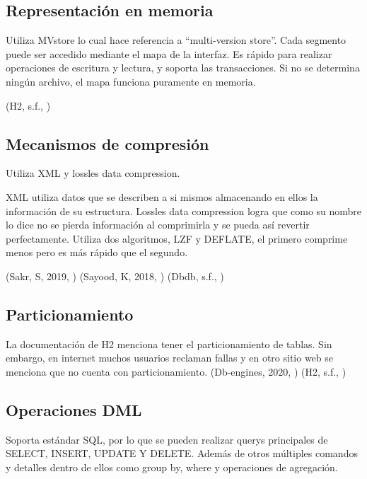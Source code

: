 \documentclass{acmart}
\begin{document}
\subsection{Representación en memoria}

Utiliza MVstore lo cual hace referencia a “multi-version store”. Cada segmento puede ser accedido mediante el mapa de la interfaz. Es rápido para realizar operaciones de escritura y lectura, y soporta las transacciones. Si no se determina ningún archivo, el mapa funciona puramente en memoria. 

(H2, s.f., \cite{h2mvstore})

\subsection{Mecanismos de compresión}

Utiliza XML y lossles data compression. 

XML utiliza datos que se describen a si mismos almacenando en ellos la información de su estructura. Lossles data compression logra que como su nombre lo dice no se pierda información al comprimirla y se pueda así revertir perfectamente.  Utiliza dos algoritmos, LZF y DEFLATE, el primero comprime menos pero es más rápido que el segundo.  

(Sakr, S, 2019, \cite{h2xml})
(Sayood, K, 2018, \cite{h2losslesscompression})
(Dbdb, s.f., \cite{h2database})



\subsection{Particionamiento}

La documentación de H2 menciona tener el particionamiento de tablas. Sin embargo, en internet muchos usuarios reclaman fallas y en otro sitio web se menciona que no cuenta con particionamiento. 
(Db-engines, 2020, \cite{h2vsoracle})
(H2, s.f., \cite{h2roadmap})



\subsection{Operaciones DML}

Soporta estándar SQL, por lo que se pueden realizar querys principales de SELECT, INSERT, UPDATE Y DELETE.  Además de otros múltiples comandos y detalles dentro de ellos como group by, where y operaciones de agregación. 
\end{document}
